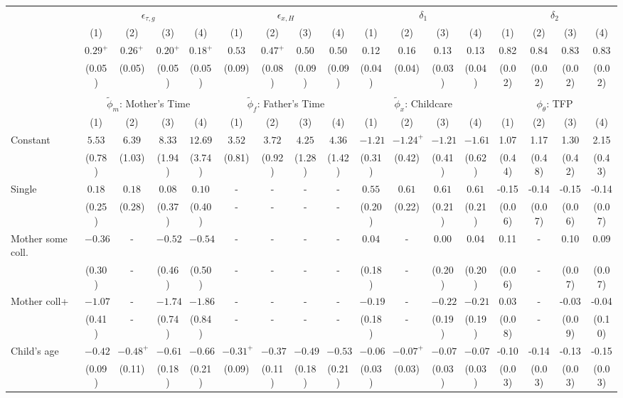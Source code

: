 \begin{tabular}{lcccccccccccccccc}\\\toprule
 & \multicolumn{4}{c}{$\epsilon_{\tau,g}$} & \multicolumn{4}{c}{$\epsilon_{x,H}$} & \multicolumn{4}{c}{$\delta_{1}$} & \multicolumn{4}{c}{$\delta_{2}$} \\
&(1)&(2)&(3)&(4)&(1)&(2)&(3)&(4)&(1)&(2)&(3)&(4)&(1)&(2)&(3)&(4)\\\cmidrule(r){2-5}\cmidrule(r){6-9}\cmidrule(r){10-13}\cmidrule(r){14-17}
&$0.29^{+}$&$0.26^{+}$&$0.20^{+}$&$0.18^{+}$&$0.53$&$0.47^{+}$&$0.50$&$0.50$&0.12&0.16&0.13&0.13&0.82&0.84&0.83&0.83\\
&(0.05)&(0.05)&(0.05)&(0.05)&(0.09)&(0.08)&(0.09)&(0.09)&(0.04)&(0.04)&(0.03)&(0.04)&(0.02)&(0.02)&(0.02)&(0.02)\\
&&&&&&&&&&&&&&&&\\
 & \multicolumn{4}{c}{$\tilde{\phi}_{m}$: Mother's Time} & \multicolumn{4}{c}{$\tilde{\phi}_{f}$: Father's Time} & \multicolumn{4}{c}{$\tilde{\phi}_{x}$: Childcare} & \multicolumn{4}{c}{$\phi_{\theta}$: TFP} \\
&(1)&(2)&(3)&(4)&(1)&(2)&(3)&(4)&(1)&(2)&(3)&(4)&(1)&(2)&(3)&(4)\\\cmidrule(r){2-5}\cmidrule(r){6-9}\cmidrule(r){10-13}\cmidrule(r){14-17}
Constant&$5.53$&$6.39$&$8.33$&$12.69$&$3.52$&$3.72$&$4.25$&$4.36$&$-1.21$&$-1.24^{+}$&$-1.21$&$-1.61$&1.07&1.17&1.30&2.15\\
&(0.78)&(1.03)&(1.94)&(3.74)&(0.81)&(0.92)&(1.28)&(1.42)&(0.31)&(0.42)&(0.41)&(0.62)&(0.44)&(0.48)&(0.42)&(0.43)\\
Single&$0.18$&$0.18$&$0.08$&$0.10$&-&-&-&-&$0.55$&$0.61$&$0.61$&$0.61$&-0.15&-0.14&-0.15&-0.14\\
&(0.25)&(0.28)&(0.37)&(0.40)&-&-&-&-&(0.20)&(0.22)&(0.21)&(0.21)&(0.06)&(0.07)&(0.06)&(0.07)\\
Mother some coll.&$-0.36$&-&$-0.52$&$-0.54$&-&-&-&-&$0.04$&-&$0.00$&$0.04$&0.11&-&0.10&0.09\\
&(0.30)&-&(0.46)&(0.50)&-&-&-&-&(0.18)&-&(0.20)&(0.20)&(0.06)&-&(0.07)&(0.07)\\
Mother coll+&$-1.07$&-&$-1.74$&$-1.86$&-&-&-&-&$-0.19$&-&$-0.22$&$-0.21$&0.03&-&-0.03&-0.04\\
&(0.41)&-&(0.74)&(0.84)&-&-&-&-&(0.18)&-&(0.19)&(0.19)&(0.08)&-&(0.09)&(0.10)\\
Child's age&$-0.42$&$-0.48^{+}$&$-0.61$&$-0.66$&$-0.31^{+}$&$-0.37$&$-0.49$&$-0.53$&$-0.06$&$-0.07^{+}$&$-0.07$&$-0.07$&-0.10&-0.14&-0.13&-0.15\\
&(0.09)&(0.11)&(0.18)&(0.21)&(0.09)&(0.11)&(0.18)&(0.21)&(0.03)&(0.03)&(0.03)&(0.03)&(0.03)&(0.03)&(0.03)&(0.03)\\

\end{tabular}
